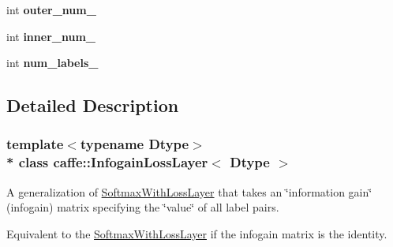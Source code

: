 \begin{DoxyCompactItemize}
\item 
int {\bfseries outer\+\_\+num\+\_\+}\hypertarget{classcaffe_1_1InfogainLossLayer_aaf878e99cf00ac309ed533adf43bcbc3}{}\label{classcaffe_1_1InfogainLossLayer_aaf878e99cf00ac309ed533adf43bcbc3}

\item 
int {\bfseries inner\+\_\+num\+\_\+}\hypertarget{classcaffe_1_1InfogainLossLayer_a6707b103411c0acc3fddd065e91fe6e0}{}\label{classcaffe_1_1InfogainLossLayer_a6707b103411c0acc3fddd065e91fe6e0}

\item 
int {\bfseries num\+\_\+labels\+\_\+}\hypertarget{classcaffe_1_1InfogainLossLayer_a8b58f39c561263cfa44c3831e6a15355}{}\label{classcaffe_1_1InfogainLossLayer_a8b58f39c561263cfa44c3831e6a15355}

\end{DoxyCompactItemize}


\subsection{Detailed Description}
\subsubsection*{template$<$typename Dtype$>$\\*
class caffe\+::\+Infogain\+Loss\+Layer$<$ Dtype $>$}

A generalization of \hyperlink{classcaffe_1_1SoftmaxWithLossLayer}{Softmax\+With\+Loss\+Layer} that takes an \char`\"{}information gain\char`\"{} (infogain) matrix specifying the \char`\"{}value\char`\"{} of all label pairs. 

Equivalent to the \hyperlink{classcaffe_1_1SoftmaxWithLossLayer}{Softmax\+With\+Loss\+Layer} if the infogain matrix is the identity.


